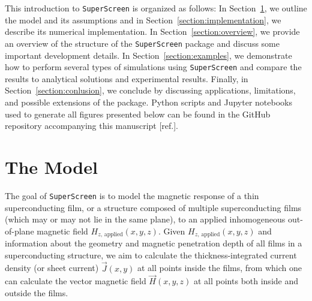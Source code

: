 \documentclass[final,3p,times,twocolumn]{elsarticle}
\newcommand{\inline}[1]{\texttt{#1}\xspace}
\newcommand{\SuperScreen}{\inline{SuperScreen}}
\begin{document}
This introduction to \SuperScreen is organized as follows: In Section~\ref{section:model}, we outline the model and its assumptions and in Section~\ref{section:implementation}, we describe its numerical implementation. In Section~\ref{section:overview}, we provide an overview of the structure of the \SuperScreen package and discuss some important development details. In Section~\ref{section:examples}, we demonstrate how to perform several types of simulations using \SuperScreen and compare the results to analytical solutions and experimental results. Finally, in Section~\ref{section:conlusion}, we conclude by discussing applications, limitations, and possible extensions of the package. Python scripts and Jupyter notebooks used to generate all figures presented below can be found in the GitHub repository accompanying this manuscript [ref.].

\section{The Model}
\label{section:model}

The goal of \SuperScreen is to model the magnetic response of a thin superconducting film, or a structure composed of multiple superconducting films (which may or may not lie in the same plane), to an applied inhomogeneous out-of-plane magnetic field
$H_{z,\,\mathrm{applied}}(x, y, z)$. Given $H_{z,\,\mathrm{applied}}(x, y, z)$ and information about the geometry and magnetic penetration depth of all films in a superconducting structure, we aim to calculate the thickness-integrated current density (or sheet current) $\vec{J}(x, y)$ at all points inside the films, from which one can calculate the vector magnetic field $\vec{H}(x, y, z)$ at all points both inside and outside the films.
\end{document}
